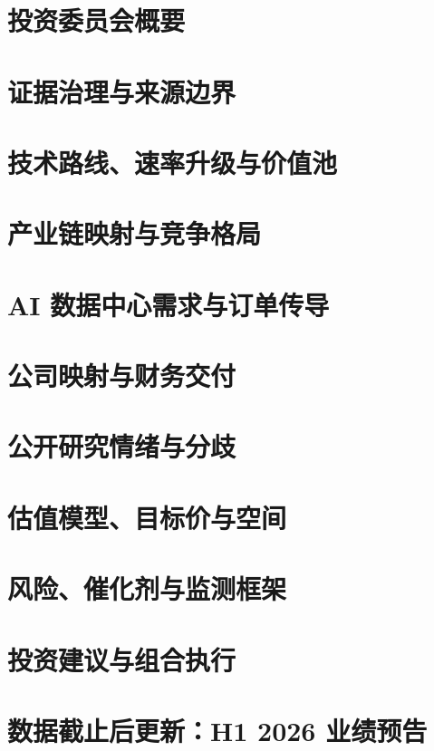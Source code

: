 \documentclass[a4paper,11pt,openany,fontset=none]{ctexrep}
\begin{document}
\astockcover
\tableofcontents
\clearpage

\chapter{投资委员会概要}

\chapter{证据治理与来源边界}

\chapter{技术路线、速率升级与价值池}

\chapter{产业链映射与竞争格局}

\chapter{AI 数据中心需求与订单传导}

\chapter{公司映射与财务交付}

\chapter{公开研究情绪与分歧}

\chapter{估值模型、目标价与空间}

\chapter{风险、催化剂与监测框架}

\chapter{投资建议与组合执行}

\chapter{数据截止后更新：H1 2026 业绩预告}


\appendix
\end{document}
